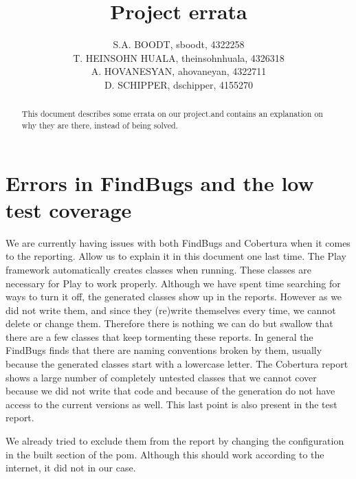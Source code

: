 \documentclass[11pt,a4paper]{report}
\author{S.A. BOODT, sboodt, 4322258\\T. HEINSOHN HUALA, theinsohnhuala, 4326318\\A. HOVANESYAN, ahovaneyan, 4322711\\D. SCHIPPER, dschipper, 4155270}
\title{Project errata}
\begin{document}
\maketitle
\begin{abstract}
This document describes some errata on our project.and contains an explanation on why they are there, instead of being solved.
\end{abstract}
\tableofcontents
\chapter{Errors in FindBugs and the low test coverage}
We are currently having issues with both FindBugs and Cobertura when it comes to the reporting. Allow us to explain it in this document one last time. The Play framework automatically creates classes when running. These classes are necessary for Play to work properly. Although we have spent time searching for ways to turn it off, the generated classes show up in the reports. However as we did not write them, and since they (re)write themselves every time, we cannot delete or change them. Therefore there is nothing we can do but swallow that there are a few classes that keep tormenting these reports. In general the FindBugs finds that there are naming conventions broken by them, usually because the generated classes start with a lowercase letter. The Cobertura report shows a large number of completely untested classes that we cannot cover because we did not write that code and because of the generation do not have access to the current versions as well. This last point is also present in the test report.

We already tried to exclude them from the report by changing the configuration in the built section of the pom. Although this should work according to the internet, it did not in our case.
\end{document}
